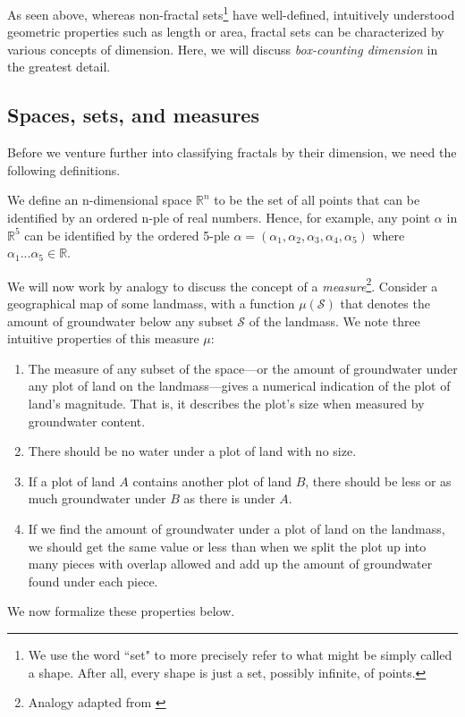 As seen above, whereas non-fractal sets\footnote{We use the word ``set" to more precisely refer to what might be simply called a shape. After all, every shape is just a set, possibly infinite, of points.}   have well-defined, intuitively understood geometric properties such as length or area, fractal sets can be characterized by various concepts of dimension. Here, we will discuss \textit{box-counting dimension} in the greatest detail.

\subsection{Spaces, sets, and measures}

Before we venture further into classifying fractals by their dimension, we need the following definitions.

\begin{mydef}
We define an n-dimensional space $ \mathbb{R}^{n} $ to be the set of all points that can be identified by an ordered n-ple of real numbers. Hence, for example, any point $ \alpha $ in $ \mathbb{R}^{5} $ can be identified by the ordered 5-ple $ \alpha = (\alpha_{1}, \alpha_{2}, \alpha_{3}, \alpha_{4}, \alpha_{5})$ where $ \alpha_{1} ... \alpha_{5} \in \mathbb{R} $.\end{mydef}

We will now work by analogy to discuss the concept of a \textit{measure}\footnote{Analogy adapted from \citep{mandelbrotmultifractal}}. Consider a geographical map of some landmass, with a function $ \mu(\mathcal{S}) $ that denotes the amount of groundwater below any subset $ \mathcal{S} $ of the landmass. We note three intuitive properties of this measure $ \mu $:\begin{enumerate}
\item The measure of any subset of the space---or the amount of groundwater under any plot of land on the landmass---gives a numerical indication of the plot of land's magnitude. That is, it describes the plot's size when measured by groundwater content.
\item\label{measureofanullset} There should be no water under a plot of land with no size. 
\item\label{measureofsubsets} If a plot of land $ A $ contains another plot of land $ B $, there should be less or as much groundwater under $B$ as there is under $A$. 
\item\label{measureaddition} If we find the amount of groundwater under a plot of land on the landmass, we should get the same value or less than when we split the plot up into many pieces with overlap allowed and add up the amount of groundwater found under each piece. 
\end{enumerate}
We now formalize these properties below.

